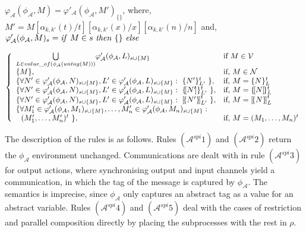 \documentclass[10pt,a4paper,final,oneside,fleqn]{book}
\begin{document}
\noindent
$\varphi_\mathcal{A}(\phi_\mathcal{A},M)=\varphi'_\mathcal{A}(\phi_\mathcal{A},M')_{\{\}}$, where, $M'=M[\alpha_{k,k'}(t)/t][\alpha_{k,k'}(x)/x][\alpha_{k,k'}(n)/n]$ and,\\
\noindent
$\varphi'_\mathcal{A}(\phi_\mathcal{A},M)_s=\mbox{{\itshape if\/} }M\in s\mbox{ {\itshape then\/} }\{\}\mbox{ {\itshape else\/}}$\vspace{5mm}

\noindent
$\left\{\begin{array}{ll}
\underset{L\in value\_of(\phi_\mathcal{A}(untag(M)))}{\bigcup}\varphi'_\mathcal{A}(\phi_\mathcal{A},L)_{s\cup\{M\}}&\mbox{if }M\in\mathcal{V}\\
\{M\},&\mbox{if, }M\in\mathcal{N}\\
\{\forall N'\in\varphi'_\mathcal{A}(\phi_\mathcal{A},N)_{s\cup\{M\}},L'\in\varphi'_\mathcal{A}(\phi_\mathcal{A},L)_{s\cup\{M\}}:~\{N'\}^t_{L'}~\},&\mbox{if, }M=\{N\}^t_{L}\\
\{\forall N'\in\varphi'_\mathcal{A}(\phi_\mathcal{A},N)_{s\cup\{M\}},L'\in\varphi'_\mathcal{A}(\phi_\mathcal{A},L)_{s\cup\{M\}}:~\{\!{[}N'\!{]}\}^t_{L'}~\},&\mbox{if, }M=\{\![N]\!\}^t_{L}\\
\{\forall N'\in\varphi'_\mathcal{A}(\phi_\mathcal{A},N)_{s\cup\{M\}},L'\in\varphi'_\mathcal{A}(\phi_\mathcal{A},L)_{s\cup\{M\}}:~{[}\!\{N'\}\!{]}^t_{L'}~\},&\mbox{if, }M={[}\!\{N\}\!{]}^t_{L}\\
\multicolumn{2}{l}{\{\forall M'_1\in\varphi'_\mathcal{A}(\phi_\mathcal{A},M_1)_{s\cup\{M\}},\ldots,M'_n\in\varphi'_\mathcal{A}(\phi_\mathcal{A},M_n)_{s\cup\{M\}}:}\\
~~(M'_1,\ldots,M'_n)^t~\},&\mbox{if, }M=(M_1,\ldots,M_n)^{t}
\end{array}\right.$\vspace{5mm}

\noindent
The description of the rules is as follows.  Rules $(\mathcal{A}^{spi}1)$ and $(\mathcal{A}^{spi}2)$ return the $\phi_\mathcal{A}$ environment unchanged.  Communications are dealt with in rule $(\mathcal{A}^{spi}3)$ for output actions, where synchronising output and input channels yield a communication, in which the tag of the message is captured by $\phi_\mathcal{A}$. The semantics is imprecise, since $\phi_\mathcal{A}$ only captures an abstract tag as a value for an abstract variable.  Rules $(\mathcal{A}^{spi}4)$ and $(\mathcal{A}^{spi}5)$ deal with the cases of restriction and parallel composition directly by placing the subprocesses with the rest in $\rho$.
\end{document}
